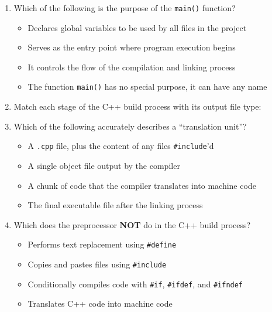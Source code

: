 \documentclass{article}
\begin{document}
\begin{enumerate}

\item Which of the following is the purpose of the \texttt{main()} function?

\begin{itemize}
	\item[(a)] Declares global variables to be used by all files in the project
	\item[(b)] Serves as the entry point where program execution begins
	\item[(c)] It controls the flow of the compilation and linking process
	\item[(d)] The function \texttt{main()} has no special purpose, it can have any name
\end{itemize}

\item Match each stage of the C++ build process with its output file type:

\begin{center}
{
}
\end{center}

\item Which of the following accurately describes a ``translation unit''?

\begin{itemize}
	\item[(a)] A \texttt{.cpp} file, plus the content of any files \texttt{\#include}'d
	\item[(b)] A single object file output by the compiler
	\item[(c)] A chunk of code that the compiler translates into machine code
	\item[(d)] The final executable file after the linking process
\end{itemize}

\item Which does the preprocessor \textbf{NOT} do in the C++ build process?
\begin{itemize}
	\item[(a)] Performs text replacement using {\texttt{\#define}}
	\item[(b)] Copies and pastes files using {\texttt{\#include}}
	\item[(c)] Conditionally compiles code with {\texttt{\#if}}, {\texttt{\#ifdef}}, and {\texttt{\#ifndef}}
	\item[(d)] {Translates C++ code into machine code}
\end{itemize}


\end{enumerate}
\end{document}
